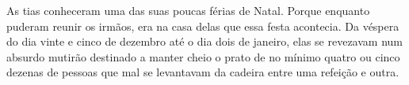 As tias conheceram uma das suas poucas férias de Natal.
Porque enquanto puderam reunir os irmãos, era na casa delas que essa festa acontecia.
Da véspera do dia vinte e cinco de dezembro até o dia dois de janeiro, elas se revezavam num absurdo mutirão destinado a manter cheio o prato de no mínimo quatro ou cinco dezenas de pessoas que mal se levantavam da cadeira entre uma refeição e outra.